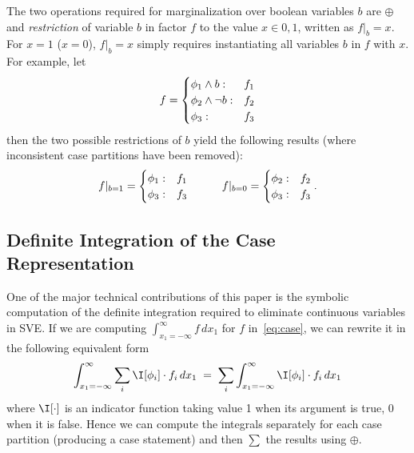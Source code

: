\documentclass[letterpaper]{article}
\renewcommand{\-}{\text{-}}
\begin{document}
{%
The two operations required for marginalization over boolean variables
$b$ are $\oplus$ and \emph{restriction} of variable $b$ in factor $f$
to the value $x \in {0,1}$, written as $f|_b=x$.
For $x = 1$ ($x = 0$), $f|_b=x$ simply requires instantiating all
variables $b$ in $f$ with $x$.  For example, let
\vspace{-1mm}
\begin{align*}
f = \begin{cases}
    \phi_1 \land b: & f_1 \\ 
    \phi_2 \land \neg b: & f_2 \\ 
    \phi_3 : & f_3 \\ 
  \end{cases}
  \vspace{-3mm}
\end{align*}
then the two possible restrictions of $b$ yield the following 
results (where inconsistent case partitions have been removed):
\vspace{-4mm}
\begin{align*}
f|_{b=1} = \begin{cases}
    \phi_1: & f_1 \\ 
    \phi_3: & f_3 \\ 
  \end{cases}
\hspace{10mm}
f|_{b=0} = \begin{cases}
    \phi_2: & f_2 \\ 
    \phi_3: & f_3 \\ 
  \end{cases}.
  \vspace{-4mm}
\end{align*}

\subsection{Definite Integration of the Case Representation}

\label{sec:def_int}

One of the major technical contributions of this paper is the symbolic
computation of the definite integration required to eliminate
continuous variables in SVE.  If we are 
computing $\int_{x_1=-\infty}^{\infty} f \, dx_1$ for $f$ 
in~\eqref{eq:case}, we can rewrite it in the following equivalent form
\vspace{-2mm}
{\footnotesize
\begin{equation}
\int_{x_1=-\infty}^{\infty} \sum_i \I[\phi_i] \cdot f_i \, dx_1 \; = \; \sum_i \int_{x_1=-\infty}^{\infty} \I[\phi_i] \cdot f_i \, dx_1 \label{eq:int_decomp}
\vspace{-1mm}
\end{equation}
}
where $\I[\cdot]$ is an indicator function taking value 1 when
its argument is true, 0 when it is false.  Hence we can compute
the integrals separately for each case partition (producing a 
case statement) and then $\sum$ the results using $\oplus$.

}
\end{document}

